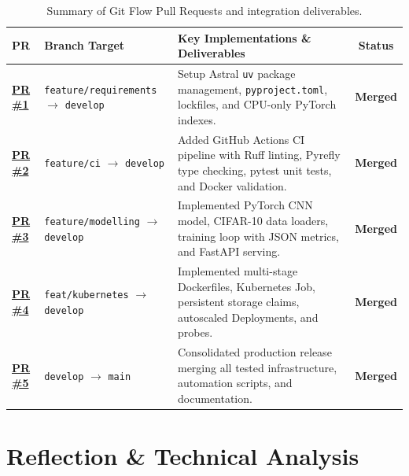 \documentclass[10pt,a4paper]{article}
\begin{document}
\begin{table}[H]
\centering
\small
\begin{tabularx}{\textwidth}{@{} l >{\raggedright\arraybackslash}p{4.2cm} X c @{}}
\toprule
\textbf{PR} & \textbf{Branch Target} & \textbf{Key Implementations \& Deliverables} & \textbf{Status} \\
\midrule
\href{https://github.com/risan-raja/mlops-pytorch-pipeline/pull/1}{\textbf{PR \#1}} &
\texttt{feature/requirements} $\rightarrow$ \texttt{develop} &
Setup Astral \texttt{uv} package management, \texttt{pyproject.toml}, lockfiles, and CPU-only PyTorch indexes. &
\textcolor{taggreen}{\textbf{Merged}} \\
\addlinespace[2pt]
\href{https://github.com/risan-raja/mlops-pytorch-pipeline/pull/2}{\textbf{PR \#2}} &
\texttt{feature/ci} $\rightarrow$ \texttt{develop} &
Added GitHub Actions CI pipeline with Ruff linting, Pyrefly type checking, pytest unit tests, and Docker validation. &
\textcolor{taggreen}{\textbf{Merged}} \\
\addlinespace[2pt]
\href{https://github.com/risan-raja/mlops-pytorch-pipeline/pull/3}{\textbf{PR \#3}} &
\texttt{feature/modelling} $\rightarrow$ \texttt{develop} &
Implemented PyTorch CNN model, CIFAR-10 data loaders, training loop with JSON metrics, and FastAPI serving. &
\textcolor{taggreen}{\textbf{Merged}} \\
\addlinespace[2pt]
\href{https://github.com/risan-raja/mlops-pytorch-pipeline/pull/4}{\textbf{PR \#4}} &
\texttt{feat/kubernetes} $\rightarrow$ \texttt{develop} &
Implemented multi-stage Dockerfiles, Kubernetes Job, persistent storage claims, autoscaled Deployments, and probes. &
\textcolor{taggreen}{\textbf{Merged}} \\
\addlinespace[2pt]
\href{https://github.com/risan-raja/mlops-pytorch-pipeline/pull/5}{\textbf{PR \#5}} &
\texttt{develop} $\rightarrow$ \texttt{main} &
Consolidated production release merging all tested infrastructure, automation scripts, and documentation. &
\textcolor{taggreen}{\textbf{Merged}} \\
\bottomrule
\end{tabularx}
\caption{Summary of Git Flow Pull Requests and integration deliverables.}
\label{tab:prs}
\end{table}

\newpage

\section{Reflection \& Technical Analysis}
\end{document}
